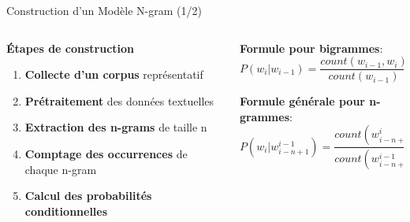 \documentclass[aspectratio=169,11pt]{beamer}
\begin{document}
\begin{frame}{Construction d'un Modèle N-gram (1/2)}
    \begin{columns}
        \begin{column}{0.5\textwidth}
            \textbf{Étapes de construction}
            \begin{enumerate}
                \item \textbf{Collecte d'un corpus} représentatif
                \item \textbf{Prétraitement} des données textuelles
                \item \textbf{Extraction des n-grams} de taille n
                \item \textbf{Comptage des occurrences} de chaque n-gram
                \item \textbf{Calcul des probabilités conditionnelles}
            \end{enumerate}
            
            \vspace{0.2cm}

        \end{column}
        \begin{column}{0.5\textwidth}
            \textbf{Formule pour bigrammes}:
            \begin{equation}
            P(w_i|w_{i-1}) = \frac{count(w_{i-1}, w_i)}{count(w_{i-1})}
            \end{equation}
            
            \vspace{0.2cm}
            \textbf{Formule générale pour n-grammes}:
            \begin{equation}
            P(w_i|w_{i-n+1}^{i-1}) = \frac{count(w_{i-n+1}^{i})}{count(w_{i-n+1}^{i-1})}
            \end{equation}
        \end{column}
    \end{columns}
\end{frame}
\end{document}

